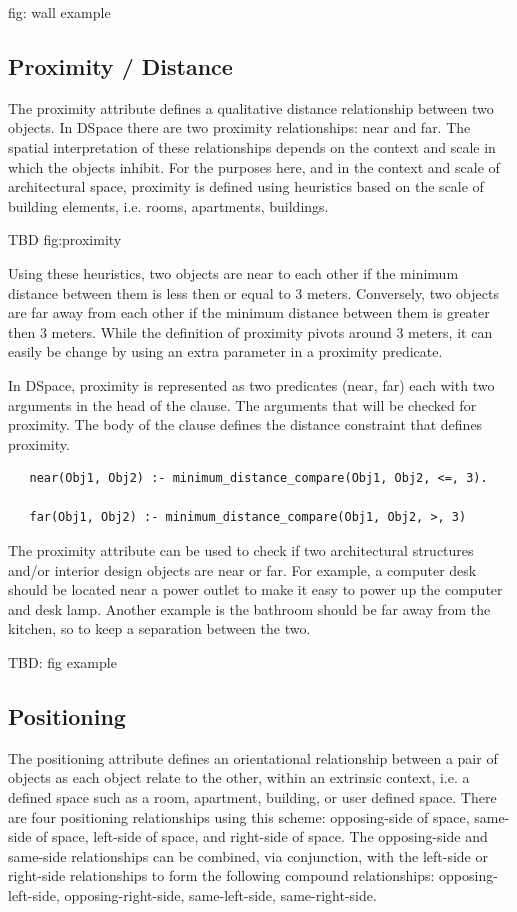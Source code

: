 \documentclass[12pt]{ucthesis}
\begin{document}
fig: wall example

\subsection{Proximity / Distance}
The proximity attribute defines a qualitative distance relationship between two objects. In DSpace there are two proximity relationships: near and far. The spatial interpretation of these relationships depends on the context and scale in which the objects inhibit. For the purposes here, and in the context and scale of architectural space, proximity is defined using heuristics based on the scale of building elements, i.e. rooms, apartments, buildings.

TBD fig:proximity


Using these heuristics, two objects are near to each other if the minimum distance between them is less then or equal to 3 meters. Conversely, two objects are far away from each other if the minimum distance between them is greater then 3 meters. While the definition of proximity pivots around 3 meters, it can easily be change by using an extra parameter in a proximity predicate. 

In DSpace, proximity is represented as two predicates (near, far) each with two arguments in the head of the clause. The arguments that will be checked for proximity. The body of the clause defines the distance constraint that defines proximity.

\begin{verbatim}
   near(Obj1, Obj2) :- minimum_distance_compare(Obj1, Obj2, <=, 3).
   
   far(Obj1, Obj2) :- minimum_distance_compare(Obj1, Obj2, >, 3)

\end{verbatim}

The proximity attribute can be used to check if two architectural structures and/or interior design objects are near or far. For example, a computer desk should be located near a power outlet to make it easy to power up the computer and desk lamp. Another example is the bathroom should be far away from the kitchen, so to keep a separation between the two.

TBD: fig example


\subsection{Positioning}
The positioning attribute defines an orientational relationship between a pair of objects as each object relate to the other, within an extrinsic context, i.e. a defined space such as a room, apartment, building, or user defined space. There are four positioning relationships using this scheme: opposing-side of space, same-side of space, left-side of space, and right-side of space. The opposing-side and same-side relationships can be combined, via conjunction, with the left-side or right-side relationships to form the following compound relationships: opposing-left-side, opposing-right-side, same-left-side, same-right-side.
\end{document}

